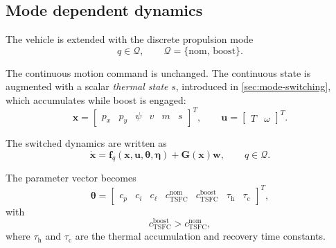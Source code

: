\documentclass[11pt,a4paper]{article}
\newcommand{\Qset}{\mathcal{Q}}
\newcommand{\vecx}{\bm{x}}
\newcommand{\vecu}{\bm{u}}
\newcommand{\vecw}{\bm{w}}
\newcommand{\vectheta}{\bm{\theta}}
\newcommand{\veceta}{\bm{\eta}}
\newcommand{\vecf}{\bm{f}}
\newcommand{\matG}{\bm{G}}
\begin{document}
\subsection{Mode dependent dynamics}

The vehicle is extended with the discrete propulsion mode
\begin{equation}
  q \in \Qset, \qquad \Qset = \{\mathrm{nom},\, \mathrm{boost}\} .
\end{equation}

The continuous motion command is unchanged. The continuous state is augmented
with a scalar \emph{thermal state} $s$, introduced in
\cref{sec:mode-switching}, which accumulates while boost is engaged:
\begin{equation}
  \vecx = \begin{bmatrix} p_x & p_y & \psi & v & m & s \end{bmatrix}^{T},
  \qquad
  \vecu = \begin{bmatrix} T & \omega \end{bmatrix}^{T} .
\end{equation}

The switched dynamics are written as
\begin{equation}
  \dot{\vecx} = \vecf_q(\vecx, \vecu, \vectheta, \veceta) + \matG(\vecx)\vecw,
  \qquad q \in \Qset .
\end{equation}

The parameter vector becomes
\begin{equation}
  \vectheta = \begin{bmatrix}
    c_p & c_i & c_\ell &
    c^{\mathrm{nom}}_{\mathrm{TSFC}} & c^{\mathrm{boost}}_{\mathrm{TSFC}} &
    \tau_{\mathrm{h}} & \tau_{\mathrm{c}}
  \end{bmatrix}^{T},
\end{equation}
with
\begin{equation}
  c^{\mathrm{boost}}_{\mathrm{TSFC}} > c^{\mathrm{nom}}_{\mathrm{TSFC}},
\end{equation}
where $\tau_{\mathrm{h}}$ and $\tau_{\mathrm{c}}$ are the thermal accumulation
and recovery time constants.
\end{document}
